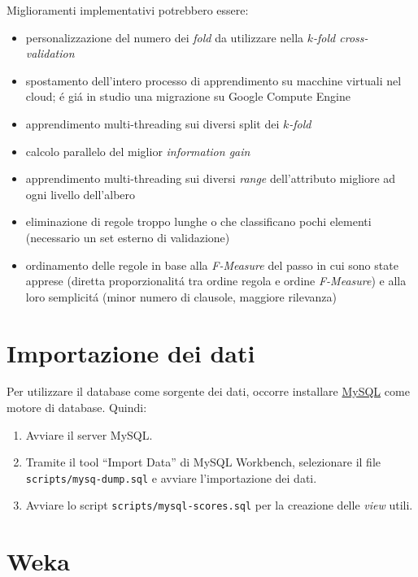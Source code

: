 \documentclass[preprint]{acm_proc_article-sp}
\begin{document}
Miglioramenti implementativi potrebbero essere:
\begin{itemize}
\item personalizzazione del numero dei \textit{fold} da utilizzare nella $k$\textit{-fold cross-validation}
\item spostamento dell'intero processo di apprendimento su macchine virtuali nel cloud; \'e gi\'a in studio una migrazione su Google Compute Engine
\item apprendimento multi-threading sui diversi split dei $k$\textit{-fold}
\item calcolo parallelo del miglior \textit{information gain}
\item apprendimento multi-threading sui diversi \textit{range} dell'attributo migliore ad ogni livello dell'albero 
\item eliminazione di regole troppo lunghe o che classificano pochi elementi (necessario un set esterno di validazione)
\item ordinamento delle regole in base alla \textit{F-Measure} del passo in cui sono state apprese (diretta proporzionalit\'a tra ordine regola e ordine \textit{F-Measure}) e alla loro semplicit\'a (minor numero di clausole, maggiore rilevanza)
\end{itemize}



\appendix

\section{Importazione dei dati}
\label{appendix-data}
Per utilizzare il database come sorgente dei dati, occorre installare \href{http://www.mysql.com/}{MySQL} come motore di database.
Quindi:

\begin{enumerate}
\item Avviare il server MySQL.
\item Tramite il tool ``Import Data'' di MySQL Workbench, selezionare il file \verb|scripts/mysq-dump.sql| e avviare l'importazione dei dati.
\item Avviare lo script \verb|scripts/mysql-scores.sql| per la creazione delle \textit{view} utili.
\end{enumerate}

\section{Weka}
\label{appendix-weka}
\end{document}
